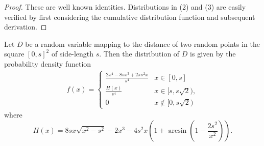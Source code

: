 \begin{proof}
These are well known identities. Distributions in (2) and (3) are
easily verified by first considering the cumulative distribution function
and subsequent derivation.
\end{proof} 

\begin{theorem} \label{theorem:distance_square}
  Let $D$ be a random variable mapping to the distance of
  two random points in the square $[0,s]^2$ of side-length $s$. Then the
  distribution of $D$ is given by the probability density function
  \vspace{0.25cm}
  \begin{align}\label{eq:distance_square}
    f(x) = \begin{cases} \frac{2 x^4 - 8 s x^3 + 2 \pi s^2 x}{s^4} & x \in
      [0,s]\\ \frac{H(x)}{s^4} & x \in [s,s\sqrt{2}),\\0 & x \notin [0,s\sqrt{2})
               \end{cases}
  \end{align}
  where
  \[
    H(x)=8 s x \sqrt{x^2-s^2} - 2x^3  
          - 4 s^2 x \left(1+\arcsin\left(1-\frac{2 s^2}{x^2}\right)\right).
  \]
\end{theorem}
%
